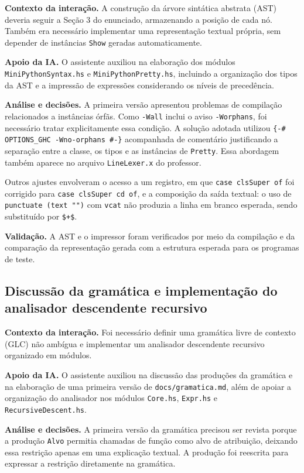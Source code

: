 \textbf{Contexto da interação.} A construção da árvore sintática
abstrata (AST) deveria seguir a Seção 3 do enunciado, armazenando
a posição de cada nó. Também era necessário implementar uma
representação textual própria, sem depender de instâncias
\texttt{Show} geradas automaticamente.

\textbf{Apoio da IA.} O assistente auxiliou na elaboração dos
módulos \texttt{MiniPythonSyntax.hs} e
\texttt{MiniPythonPretty.hs}, incluindo a organização dos tipos
da AST e a impressão de expressões considerando os níveis
de precedência.

\textbf{Análise e decisões.} A primeira versão apresentou
problemas de compilação relacionados a instâncias órfãs.
Como \texttt{-Wall} inclui o aviso \texttt{-Worphans}, foi
necessário tratar explicitamente essa condição. A solução
adotada utilizou \texttt{\{-\# OPTIONS\_GHC -Wno-orphans \#-\}}
acompanhada de comentário justificando a separação entre
a classe, os tipos e as instâncias de \texttt{Pretty}. Essa
abordagem também aparece no arquivo \texttt{LineLexer.x}
do professor.

Outros ajustes envolveram o acesso a um registro, em que
\texttt{case clsSuper of} foi corrigido para
\texttt{case clsSuper cd of}, e a composição da saída textual:
o uso de \texttt{punctuate (text "")} com \texttt{vcat}
não produzia a linha em branco esperada, sendo substituído
por \texttt{\$+\$}.

\textbf{Validação.} A AST e o impressor foram verificados por
meio da compilação e da comparação da representação gerada
com a estrutura esperada para os programas de teste.

\subsection{Discussão da gramática e implementação do analisador descendente recursivo}

\textbf{Contexto da interação.} Foi necessário definir uma
gramática livre de contexto (GLC) não ambígua e implementar
um analisador descendente recursivo organizado em módulos.

\textbf{Apoio da IA.} O assistente auxiliou na discussão das
produções da gramática e na elaboração de uma primeira versão
de \texttt{docs/gramatica.md}, além de apoiar a organização
do analisador nos módulos \texttt{Core.hs}, \texttt{Expr.hs}
e \texttt{RecursiveDescent.hs}.

\textbf{Análise e decisões.} A primeira versão da gramática
precisou ser revista porque a produção \texttt{Alvo} permitia
chamadas de função como alvo de atribuição, deixando essa
restrição apenas em uma explicação textual. A produção foi
reescrita para expressar a restrição diretamente na gramática.

